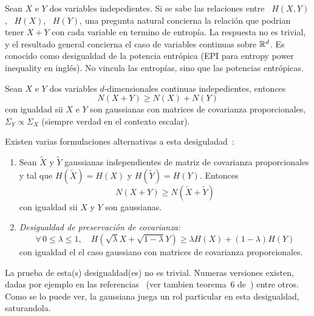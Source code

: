 

Sean $X$  e $Y$ dos variables indepedientes.  Si se sabe las  relaciones entre \
$H(X,Y)$, \ $H(X)$,  \ $H(Y)$, una pregunta natural  concierna la relaci\'on que
podrian tener $X+Y$ con cada variable en termino de entrop\'ia. La respuesta no es
trivial, y el  resultado general concierna el caso  de variables continuas sobre
$\mathbb{R}^d$.   Es conocido  como desigualdad  de la  potencia entr\'opica  (EPI para
entropy power  inequality en ingl\'es). No  vincula las entrop\'ias,  sino que las
potencias entr\'opicas.
%
\begin{teorema}
  Sean  $X$  e  $Y$  dos variables  $d$-dimensionales  continuas  indepedientes,
  entonces
  \[
  N(X + Y) \ge N(X) + N(Y)
  \]
%
  con  igualdad  sii  $X$  e  $Y$  son gaussianas  con  matrices  de  covarianza
  proporcionales,  $\Sigma_Y \propto  \Sigma_X$ (siempre  verdad en  el contexto
  escalar).
\end{teorema}
%
\noindent     Existen    varias     formulaciones     alternativas    a     esta
desiguladad~\cite{Sha48, Lie78, CovTho06, DemCov91, Rio07}:
%
\begin{enumerate}
\item\label{EPI:SZ:EquivGauss} Sean $\widetilde{X}$ y $\widetilde{Y}$ gaussianas
  independientes   de   matriz   de   covarianza  proporcionales   y   tal   que
  $H(\widetilde{X}) =  H(X)$ y $H(\widetilde{Y}) = H(Y)$.  Entonces
  \[
  N(X+Y) \ge N\left( \widetilde{X} + \widetilde{Y} \right)
  \]
  con igualdad sii $X$ y $Y$ son gaussianas.
%
\item\label{EPI:SZ:PresCov}    {\it    Desigualdad    de    preservaci\'on    de
    covarianza:}
  \[
  \forall  \,   0  \le  \lambda  \le   1,  \quad  H\left(   \sqrt{\lambda}  X  +
    \sqrt{1-\lambda} Y \right) \ge \lambda H(X) + (1-\lambda) H(Y)
  \]
  con igualdad el el caso gaussiano con matrices de covarianza proporcionales.
\end{enumerate}
%

La prueba  de esta(s) desigualdad(es) no es  trivial.  Numeras versiones
existen,  dadas por  ejemplo  en las  referencias~\cite{Bla65, Sta59,  ShaWea64,
  Rio07,  Rio11,  Rio17,  CovTho06,  DemCov91,  Lie78,  VerGuo06}  (ver  tambien
teorema~6  de~\cite{Lie75}) entre  otros.  Como  se lo  puede ver,  la gaussiana
juega un rol particular en esta desigualdad, saturandola.


